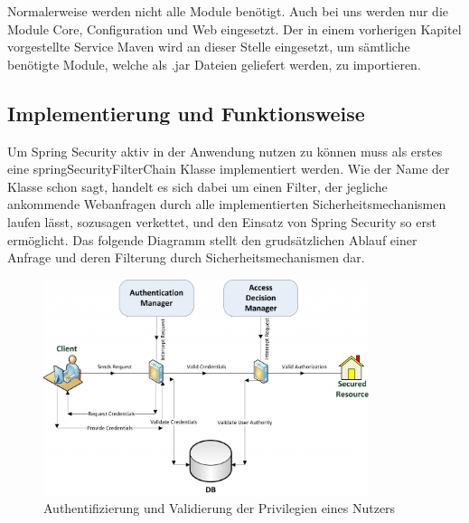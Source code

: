 Normalerweise werden nicht alle Module benötigt. Auch bei uns werden nur die Module Core, 
Configuration und Web eingesetzt. Der in einem vorherigen Kapitel vorgestellte Service Maven wird an 
dieser Stelle eingesetzt, um sämtliche benötigte Module, welche als .jar Dateien geliefert werden, zu 
importieren.

\subsection{Implementierung und Funktionsweise}

Um Spring Security aktiv in der Anwendung nutzen zu können muss als erstes eine springSecurityFilterChain 
Klasse implementiert werden. Wie der Name der Klasse schon sagt, handelt es sich dabei um einen Filter, der 
jegliche ankommende Webanfragen durch alle implementierten Sicherheitsmechanismen laufen lässt, sozusagen 
verkettet, und den Einsatz von Spring Security so erst ermöglicht. Das folgende Diagramm stellt den 
grudsätzlichen Ablauf einer Anfrage und deren Filterung durch Sicherheitsmechanismen dar.

\begin{figure}
    \centering
    \includegraphics[width=0.85\textwidth]{Graphics/security/user_privileges}
    \caption{Authentifizierung und Validierung der Privilegien eines Nutzers}
   \label{fig:user_privileges}
\end{figure}

